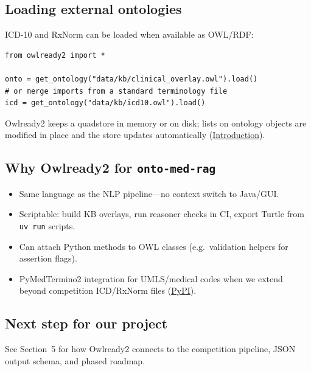 \subsection{Loading external ontologies}

ICD-10 and RxNorm can be loaded when available as OWL/RDF:

\begin{verbatim}
from owlready2 import *

onto = get_ontology("data/kb/clinical_overlay.owl").load()
# or merge imports from a standard terminology file
icd = get_ontology("data/kb/icd10.owl").load()
\end{verbatim}

Owlready2 keeps a quadstore in memory or on disk; lists on ontology objects are
modified in place and the store updates automatically
(\href{https://owlready2.readthedocs.io/en/latest/intro.html}{Introduction}).

\subsection{Why Owlready2 for \texttt{onto-med-rag}}

\begin{itemize}
  \item Same language as the NLP pipeline---no context switch to Java/GUI.
  \item Scriptable: build KB overlays, run reasoner checks in CI, export Turtle
        from \texttt{uv run} scripts.
  \item Can attach Python methods to OWL classes (e.g.\ validation helpers for
        assertion flags).
  \item PyMedTermino2 integration for UMLS/medical codes when we extend beyond
        competition ICD/RxNorm files
        (\href{https://pypi.org/project/owlready2/}{PyPI}).
\end{itemize}

\subsection{Next step for our project}

See Section~5 for how Owlready2 connects to the competition pipeline, JSON output
schema, and phased roadmap.
